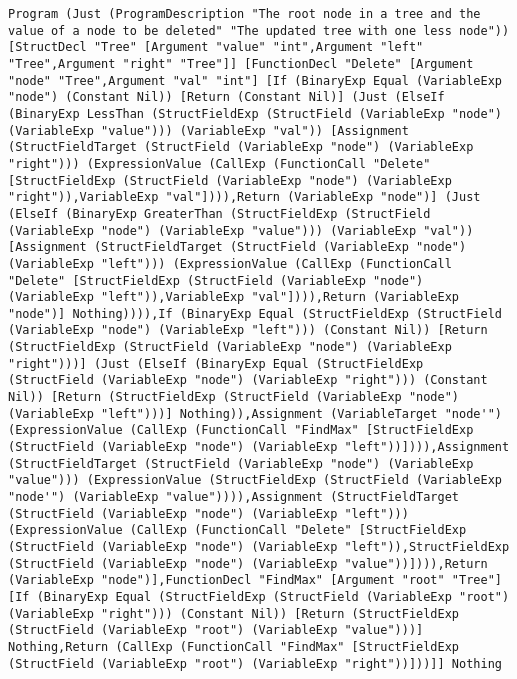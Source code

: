 \begin{lstlisting}[caption={The Psnodig AST generated by parsing \Cref{deleteBSTGourmet}.}, captionpos=b, label={dbstAST}]
Program (Just (ProgramDescription "The root node in a tree and the value of a node to be deleted" "The updated tree with one less node")) [StructDecl "Tree" [Argument "value" "int",Argument "left" "Tree",Argument "right" "Tree"]] [FunctionDecl "Delete" [Argument "node" "Tree",Argument "val" "int"] [If (BinaryExp Equal (VariableExp "node") (Constant Nil)) [Return (Constant Nil)] (Just (ElseIf (BinaryExp LessThan (StructFieldExp (StructField (VariableExp "node") (VariableExp "value"))) (VariableExp "val")) [Assignment (StructFieldTarget (StructField (VariableExp "node") (VariableExp "right"))) (ExpressionValue (CallExp (FunctionCall "Delete" [StructFieldExp (StructField (VariableExp "node") (VariableExp "right")),VariableExp "val"]))),Return (VariableExp "node")] (Just (ElseIf (BinaryExp GreaterThan (StructFieldExp (StructField (VariableExp "node") (VariableExp "value"))) (VariableExp "val")) [Assignment (StructFieldTarget (StructField (VariableExp "node") (VariableExp "left"))) (ExpressionValue (CallExp (FunctionCall "Delete" [StructFieldExp (StructField (VariableExp "node") (VariableExp "left")),VariableExp "val"]))),Return (VariableExp "node")] Nothing)))),If (BinaryExp Equal (StructFieldExp (StructField (VariableExp "node") (VariableExp "left"))) (Constant Nil)) [Return (StructFieldExp (StructField (VariableExp "node") (VariableExp "right")))] (Just (ElseIf (BinaryExp Equal (StructFieldExp (StructField (VariableExp "node") (VariableExp "right"))) (Constant Nil)) [Return (StructFieldExp (StructField (VariableExp "node") (VariableExp "left")))] Nothing)),Assignment (VariableTarget "node'") (ExpressionValue (CallExp (FunctionCall "FindMax" [StructFieldExp (StructField (VariableExp "node") (VariableExp "left"))]))),Assignment (StructFieldTarget (StructField (VariableExp "node") (VariableExp "value"))) (ExpressionValue (StructFieldExp (StructField (VariableExp "node'") (VariableExp "value")))),Assignment (StructFieldTarget (StructField (VariableExp "node") (VariableExp "left"))) (ExpressionValue (CallExp (FunctionCall "Delete" [StructFieldExp (StructField (VariableExp "node") (VariableExp "left")),StructFieldExp (StructField (VariableExp "node") (VariableExp "value"))]))),Return (VariableExp "node")],FunctionDecl "FindMax" [Argument "root" "Tree"] [If (BinaryExp Equal (StructFieldExp (StructField (VariableExp "root") (VariableExp "right"))) (Constant Nil)) [Return (StructFieldExp (StructField (VariableExp "root") (VariableExp "value")))] Nothing,Return (CallExp (FunctionCall "FindMax" [StructFieldExp (StructField (VariableExp "root") (VariableExp "right"))]))]] Nothing
\end{lstlisting}

